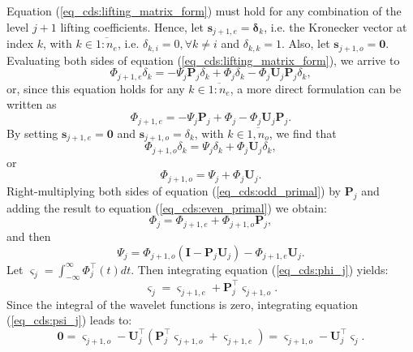 \documentclass[graybox]{svmult}
\begin{document}
	Equation (\ref{eq_cds:lifting_matrix_form}) must hold for any combination of the level $j+1$ lifting coefficients. Hence, let $\mathbf{s}_{j+1,e} = \boldsymbol{\delta}_k$, i.e. the Kronecker vector at index $k$, with $k \in \overline{1:n_e}$, i.e. $\delta_{k,i} = 0, \forall k \neq i$ and $\delta_{k,k} = 1$. Also, let $\mathbf{s}_{j+1,o} = \mathbf{0}$. Evaluating both sides of equation (\ref{eq_cds:lifting_matrix_form}), we arrive to
	\begin{equation}
	\Phi_{j+1,e}\delta_k = -\Psi_j\mathbf{P}_j\delta_k + \Phi_j \delta_k - \Phi_j \mathbf{U}_j\mathbf{P}_j \delta_k,
	\end{equation}
	or, since this equation holds for any $k \in \overline{1: n_e}$, a more direct formulation can be written as
	\begin{equation}
	\Phi_{j+1,e}= -\Psi_j\mathbf{P}_j + \Phi_j  - \Phi_j \mathbf{U}_j\mathbf{P}_j.
	\label{eq_cds:even_primal}
	\end{equation}
	By setting $\mathbf{s}_{j+1,e} = \mathbf{0}$ and $\mathbf{s}_{j+1,o} = \delta_k$, with $k \in \overline{1, n_o}$, we find that
	\begin{equation}
	\Phi_{j+1,o}\delta_k  = \Psi_j \delta_k + \Phi_j \mathbf{U}_j \delta_k,
	\end{equation}
	or
	\begin{equation}
	\Phi_{j+1,o} = \Psi_j + \Phi_j \mathbf{U}_j.
	\label{eq_cds:odd_primal}
	\end{equation}
	Right-multiplying both sides of equation (\ref{eq_cds:odd_primal}) by $\mathbf{P}_j$ and adding the result to equation (\ref{eq_cds:even_primal}) we obtain:
	\begin{equation}
	\Phi_j = \Phi_{j+1,e} + \Phi_{j+1,o} \mathbf{P}_j,
	\label{eq_cds:phi_j}
	\end{equation}
	and then
	\begin{equation}
	\Psi_j = \Phi_{j+1,o}(\mathbf{I} - \mathbf{P}_j\mathbf{U}_j) - \Phi_{j+1,e}\mathbf{U}_j.
	\label{eq_cds:psi_j}
	\end{equation}
	Let $\varsigma_j = \int_{-\infty}^{\infty}{\Phi_j^\intercal(t) dt}$. Then integrating equation (\ref{eq_cds:phi_j}) yields:
	\begin{equation}
	\varsigma_j = \varsigma_{j+1,e} + \mathbf{P}_j^\intercal \varsigma_{j+1,o}.
	\label{eq_cds:int_scaling}
	\end{equation}
	Since the integral of the wavelet functions is zero, integrating equation (\ref{eq_cds:psi_j})  leads to:
	\begin{equation}
	\mathbf{0} = \varsigma_{j+1,o} - \mathbf{U}_j^\intercal \left(\mathbf{P}_j^\intercal \varsigma_{j+1,o} + \varsigma_{j+1,e} \right) = \varsigma_{j+1,o} - \mathbf{U}_j^\intercal \varsigma_j.
	\label{eq_cds:int_wavelet}
	\end{equation}
\end{document}
